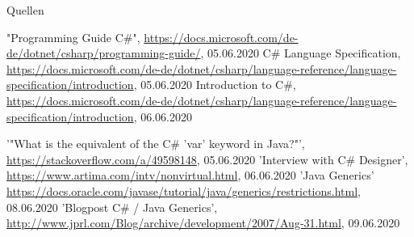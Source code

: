 \documentclass[11pt]{beamer}
\begin{document}
\begin{frame}{Quellen}
\begin{thebibliography}{99}
\fontsize{6pt}{7.2}\selectfont
	"Programming Guide C\#", \url{https://docs.microsoft.com/de-de/dotnet/csharp/programming-guide/}, 05.06.2020
	 C\# Language Specification, \url{https://docs.microsoft.com/de-de/dotnet/csharp/language-reference/language-specification/introduction}, 05.06.2020
   Introduction to C\#, \url{https://docs.microsoft.com/de-de/dotnet/csharp/language-reference/language-specification/introduction}, 06.06.2020

 '"What is the equivalent of the C\# 'var' keyword in Java?"', 
 \url{https://stackoverflow.com/a/49598148}, 05.06.2020
 'Interview with C\# Designer', \url{https://www.artima.com/intv/nonvirtual.html}, 06.06.2020
  'Java Generics' \url{https://docs.oracle.com/javase/tutorial/java/generics/restrictions.html}, 08.06.2020
  'Blogpost C\# / Java Generics', \url{http://www.jprl.com/Blog/archive/development/2007/Aug-31.html}, 09.06.2020
\end{thebibliography}
\end{frame}
\end{document}
